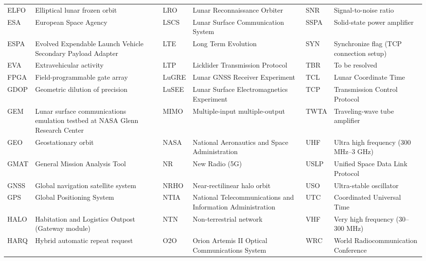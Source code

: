 \documentclass{IEEEoj}
\begin{document}
\begin{table}[!t]
\begin{tabularx}{\textwidth}{@{}l>{\raggedright\arraybackslash}Xl>{\raggedright\arraybackslash}Xl>{\raggedright\arraybackslash}X}
ELFO & Elliptical lunar frozen orbit & LRO & Lunar Reconnaissance Orbiter & SNR & Signal-to-noise ratio \\
ESA & European Space Agency & LSCS & Lunar Surface Communication System & SSPA & Solid-state power amplifier \\
ESPA & Evolved Expendable Launch Vehicle Secondary Payload Adapter & LTE & Long Term Evolution & SYN & Synchronize flag (TCP connection setup) \\
EVA & Extravehicular activity & LTP & Licklider Transmission Protocol & TBR & To be resolved \\
FPGA & Field-programmable gate array & LuGRE & Lunar GNSS Receiver Experiment & TCL & Lunar Coordinate Time \\
GDOP & Geometric dilution of precision & LuSEE & Lunar Surface Electromagnetics Experiment & TCP & Transmission Control Protocol \\
GEM & Lunar surface communications emulation testbed at NASA Glenn Research Center & MIMO & Multiple-input multiple-output & TWTA & Traveling-wave tube amplifier \\
GEO & Geostationary orbit & NASA & National Aeronautics and Space Administration & UHF & Ultra high frequency (300 MHz--3 GHz) \\
GMAT & General Mission Analysis Tool & NR & New Radio (5G) & USLP & Unified Space Data Link Protocol \\
GNSS & Global navigation satellite system & NRHO & Near-rectilinear halo orbit & USO & Ultra-stable oscillator \\
GPS & Global Positioning System & NTIA & National Telecommunications and Information Administration & UTC & Coordinated Universal Time \\
HALO & Habitation and Logistics Outpost (Gateway module) & NTN & Non-terrestrial network & VHF & Very high frequency (30--300 MHz) \\
HARQ & Hybrid automatic repeat request & O2O & Orion Artemis II Optical Communications System & WRC & World Radiocommunication Conference \\
\bottomrule
\end{tabularx}
\end{table}



\end{document}
